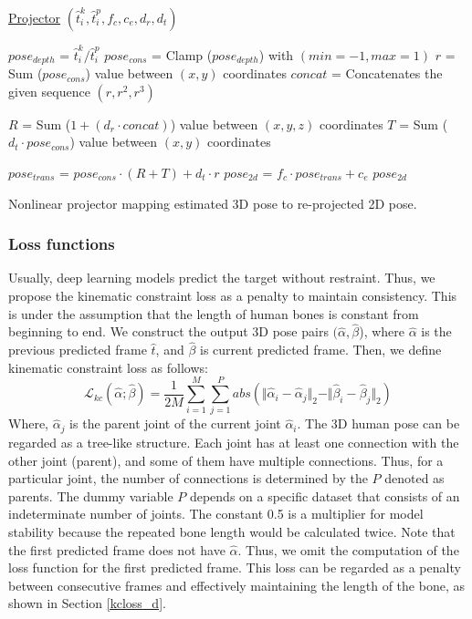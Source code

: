 \documentclass[runningheads]{llncs}
\begin{document}
\begin{algorithm}

    \underline{Projector} $(\hat{t}_{i}^{k},\hat{t}_{i}^{p}, f_c,c_e,d_r,d_t)$\;
    
    $pose_{depth}$ = $\hat{t}_{i}^{k} / \hat{t}_{i}^{p}$ \;
    $pose_{cons}$ = Clamp ($pose_{depth}$) with $(min = -1, max = 1)$  \;
    $r$ = Sum ($pose_{cons}$) value between $(x,y)$ coordinates\;
    $concat$ = Concatenates the given sequence $(r, r^2, r^3)$ \;
    
    $R$ = Sum ($1 + (d_r \cdot concat)$) value between $(x,y,z)$ coordinates\;
    $T$ = Sum ($d_t \cdot pose_{cons}$) value between $(x,y)$ coordinates\;
    
    $pose_{trans}$ = $pose_{cons} \cdot (R + T) + d_t \cdot r $ \;
    $pose_{2d}$ = $f_c \cdot pose_{trans} + c_e$ \;
    \Return $pose_{2d}$
    
    \caption{Nonlinear projector mapping estimated 3D pose to re-projected 2D pose.}
    \label{alg1}
\end{algorithm}

\subsubsection{Loss functions} Usually, deep learning models predict the target without restraint. Thus, we propose the kinematic constraint loss as a penalty to maintain consistency. This is under the assumption that the length of human bones is constant from beginning to end. We construct the output 3D pose pairs \((\hat{\alpha}, \hat{\beta}\)), where \(\hat{\alpha}\) is the previous predicted frame \(\hat{t}\), and \(\hat{\beta}\) is current predicted frame. Then, we define kinematic constraint loss as follows:
\begin{equation}
\mathcal{L}_{kc}(\hat{\alpha};\hat{\beta}) =  \frac{1}{2M} \sum\limits_{i=1}^{M} \sum\limits_{j=1}^{P} abs( \Vert \hat{\alpha}_{i} - \hat{\alpha}_{j}  \Vert_2 - \Vert \hat{\beta}_{i} - \hat{\beta}_{j}  \Vert_2 )
\end{equation}
Where, \(\hat{\alpha}_j\) is the parent joint of the current joint \(\hat{\alpha}_i\). The 3D human pose can be regarded as a tree-like structure. Each joint has at least one connection with the other joint (parent), and some of them have multiple connections. Thus, for a particular joint, the number of connections is determined by the \(P\) denoted as parents. The dummy variable \(P\) depends on a specific dataset that consists of an indeterminate number of joints. The constant 0.5 is a multiplier for model stability because the repeated bone length would be calculated twice. Note that the first predicted frame does not have \(\hat{\alpha}\). Thus, we omit the computation of the loss function for the first predicted frame. This loss can be regarded as a penalty between consecutive frames and effectively maintaining the length of the bone, as shown in Section \ref{kcloss_d}.
\end{document}
